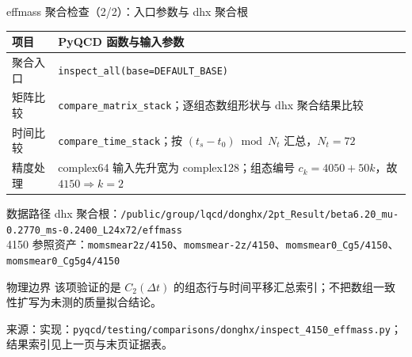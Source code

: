 \documentclass[UTF8,aspectratio=169,11pt]{ctexbeamer}
\newcommand{\source}[1]{\vspace{0.05em}\par{\raggedright\scriptsize\color{muted}来源：#1\par}}
\newcommand{\codepath}[1]{\nolinkurl{#1}}
\begin{document}
\begin{frame}[t]{effmass 聚合检查（2/2）：入口参数与 dhx 聚合根}
  \small
  \begin{tabularx}{0.96\textwidth}{@{}P{0.22\textwidth}Y@{}}
    \toprule
    项目 & PyQCD 函数与输入参数 \\
    \midrule
    聚合入口 & \codepath{inspect_all(base=DEFAULT_BASE)} \\
    矩阵比较 & \codepath{compare_matrix_stack}；逐组态数组形状与 dhx 聚合结果比较 \\
    时间比较 & \codepath{compare_time_stack}；按 $(t_s-t_0)\bmod N_t$ 汇总，$N_t=72$ \\
    精度处理 & complex64 输入先升宽为 complex128；组态编号 $c_k=4050+50k$，故 $4150\Rightarrow k=2$ \\
    \bottomrule
  \end{tabularx}
  \vspace{0.20em}
  \begin{block}{数据路径}
    \scriptsize
    dhx 聚合根：\codepath{/public/group/lqcd/donghx/2pt_Result/beta6.20_mu-0.2770_ms-0.2400_L24x72/effmass}\\
    4150 参照资产：\codepath{momsmear2z/4150}、\codepath{momsmear-2z/4150}、\codepath{momsmear0_Cg5/4150}、\codepath{momsmear0_Cg5g4/4150}
  \end{block}
  \begin{block}{物理边界}
    \scriptsize
    该项验证的是 $C_2(\Delta t)$ 的组态行与时间平移汇总索引；不把数组一致性扩写为未测的质量拟合结论。
  \end{block}
  \source{实现：\codepath{pyqcd/testing/comparisons/donghx/inspect_4150_effmass.py}；结果索引见上一页与末页证据表。}
\end{frame}
\end{document}
